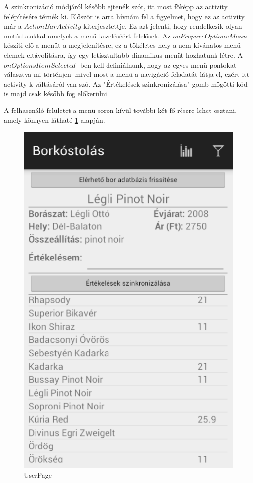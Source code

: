 \documentclass[12pt]{report}
\theoremstyle{definition}
\begin{document}
	A szinkronizáció módjáról később ejtenék szót, itt most főképp az activity felépítésére térnék ki. Először is arra hívnám fel a figyelmet, hogy ez az activity már a \linebreak$ActionBarActivity$ kiterjesztettje. Ez azt jelenti, hogy rendelkezik olyan metódusokkal amelyek a menü kezeléséért felelősek. Az $onPrepareOptionsMenu$ készíti elő a menüt a megjelenítésre, ez a tökéletes hely a nem kívánatos menü elemek eltávolításra, így egy letisztultabb dinamikus menüt hozhatunk létre. A $onOptionsItemSelected$ -ben kell definiálnunk, hogy az egyes menü pontokat választva mi történjen, mivel most a menü a navigáció feladatát látja el, ezért itt activity-k váltásáról van szó. Az "Értékelések szinkronizálása" gomb mögötti kód is majd csak később fog előkerülni.
	
	A felhasználó felületet a menü soron kívül további két fő részre lehet osztani, amely könnyen látható \ref{fig:UserPage} alapján.
	\begin{figure}[!ht]
		\centering
		\includegraphics[scale=0.5]{UserPage}
		\caption[UserPage]{UserPage}
		\label{fig:UserPage}
	\end{figure}
	
\end{document}
